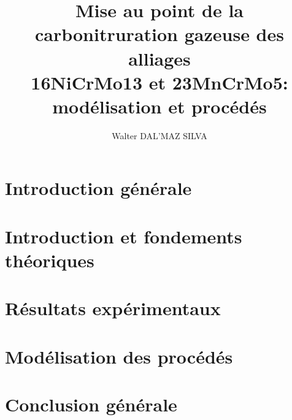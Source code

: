 \documentclass[a4paper,french,twoside]{xthesis}
\author{Walter DAL'MAZ SILVA}
\title{Mise au point de la carbonitruration gazeuse des alliages\\ 16NiCrMo13 et 23MnCrMo5: modélisation et procédés}
\begin{document}
  \newpage\setcounter{page}{1}
  
  \cleardoublepage
  \tableofcontents
  \newpage\setcounter{page}{1}
  \part*{Introduction générale}
  \cleardoublepage
  \part{Introduction et fondements théoriques}
  \label{part:part_1}
  \cleardoublepage
  \cleardoublepage
  \part{Résultats expérimentaux}
  \label{part:part_2}
  \cleardoublepage
  \cleardoublepage
  \part{Modélisation des procédés}
  \label{part:part_3}
  \cleardoublepage
  \part*{Conclusion générale}
  \cleardoublepage
  
  \begin{appendices}
    \cleardoublepage
    \cleardoublepage
    \cleardoublepage
    \cleardoublepage
    \cleardoublepage
    \cleardoublepage
    \cleardoublepage
  \end{appendices}
  \newpage{}
  \pdfbookmark{\listfigurename}{\listfigurename}
  {\singlespacing\listoffigures}
  \newpage{}
  \pdfbookmark{\listtablename}{\listtablename}
  {\singlespacing\listoftables}
  
\end{document}
